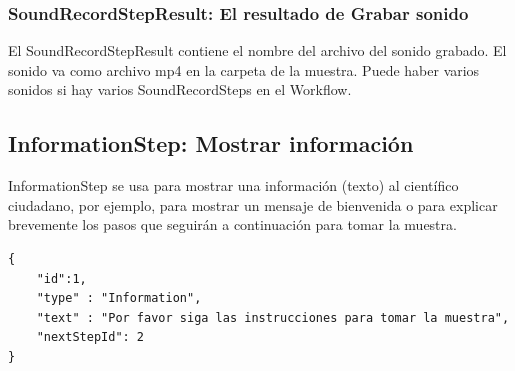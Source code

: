 \subsubsection{SoundRecordStepResult: El resultado de Grabar sonido}
El SoundRecordStepResult contiene el nombre del archivo del sonido grabado. El sonido va como archivo mp4 en la carpeta de la muestra.
Puede haber varios sonidos si hay varios SoundRecordSteps en el Workflow.



\subsection{InformationStep: Mostrar información}
InformationStep se usa para mostrar una información (texto) al científico ciudadano, por ejemplo, para mostrar un mensaje de bienvenida o para explicar brevemente los pasos que seguirán a continuación para tomar la muestra.

\begin{lstlisting}[language=XML, frame=tlbr, caption=InformationStep usando el generador de clases.]	
{
	"id":1,
	"type" : "Information",
	"text" : "Por favor siga las instrucciones para tomar la muestra",
	"nextStepId": 2
}
\end{lstlisting}

